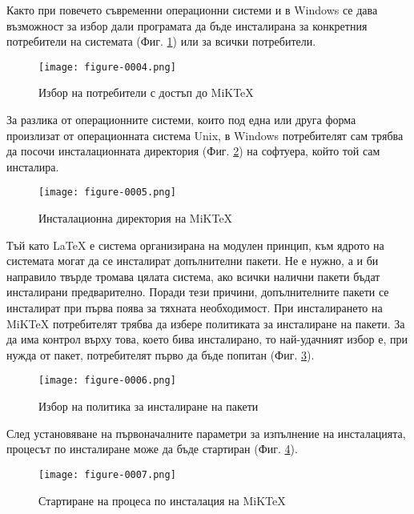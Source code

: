 Както при повечето съвременни операционни системи и в Windows се дава възможност за избор дали програмата да бъде инсталирана за конкретния потребители на системата (Фиг. \ref{figure-0004}) или за всички потребители.

\begin{figure}
  \centering
  \texttt{[image: figure-0004.png]}
  \caption{Избор на потребители с достъп до MiKTeX}
\label{figure-0004}
\end{figure}

За разлика от операционните системи, които под една или друга форма произлизат от операционната система Unix, в Windows потребителят сам трябва да посочи инсталационната директория (Фиг. \ref{figure-0005}) на софтуера, който той сам инсталира.

\begin{figure}
  \centering
  \texttt{[image: figure-0005.png]}
  \caption{Инсталационна директория на MiKTeX}
\label{figure-0005}
\end{figure}

Тъй като LaTeX е система организирана на модулен принцип, към ядрото на системата могат да се инсталират допълнителни пакети. Не е нужно, а и би направило твърде тромава цялата система, ако всички налични пакети бъдат инсталирани предварително. Поради тези причини, допълнителните пакети се инсталират при първа поява за тяхната необходимост. При инсталирането на MiKTeX потребителят трябва да избере политиката за инсталиране на пакети. За да има контрол върху това, което бива инсталирано, то най-удачният избор е, при нужда от пакет, потребителят първо да бъде попитан (Фиг. \ref{figure-0006}).

\begin{figure}
  \centering
  \texttt{[image: figure-0006.png]}
  \caption{Избор на политика за инсталиране на пакети}
\label{figure-0006}
\end{figure}

След установяване на първоначалните параметри за изпълнение на инсталацията, процесът по инсталиране може да бъде стартиран (Фиг. \ref{figure-0007}).

\begin{figure}
  \centering
  \texttt{[image: figure-0007.png]}
  \caption{Стартиране на процеса по инсталация на MiKTeX}
\label{figure-0007}
\end{figure}

